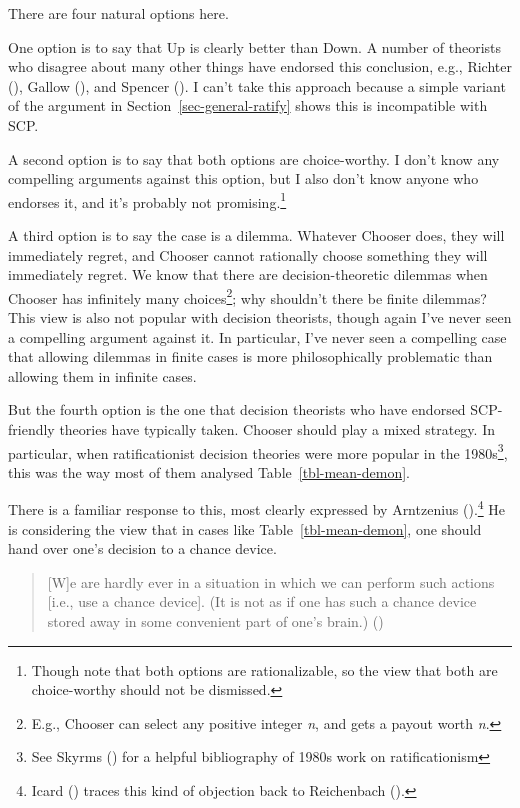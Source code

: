 \documentclass[
  10pt,
  letterpaper,
  DIV=11,
  numbers=noendperiod,
  twoside]{scrartcl}
\begin{document}
There are four natural options here.

One option is to say that Up is clearly better than Down. A number of
theorists who disagree about many other things have endorsed this
conclusion, e.g., Richter (), Gallow
(), and Spencer
(). I can't take this approach because
a simple variant of the argument in Section~\ref{sec-general-ratify}
shows this is incompatible with SCP.

A second option is to say that both options are choice-worthy. I don't
know any compelling arguments against this option, but I also don't know
anyone who endorses it, and it's probably not promising.\footnote{Though
  note that both options are rationalizable, so the view that both are
  choice-worthy should not be dismissed.}

A third option is to say the case is a dilemma. Whatever Chooser does,
they will immediately regret, and Chooser cannot rationally choose
something they will immediately regret. We know that there are
decision-theoretic dilemmas when Chooser has infinitely many
choices\footnote{E.g., Chooser can select any positive integer \emph{n},
  and gets a payout worth \emph{n}.}; why shouldn't there be finite
dilemmas? This view is also not popular with decision theorists, though
again I've never seen a compelling argument against it. In particular,
I've never seen a compelling case that allowing dilemmas in finite cases
is more philosophically problematic than allowing them in infinite
cases.

But the fourth option is the one that decision theorists who have
endorsed SCP-friendly theories have typically taken. Chooser should play
a mixed strategy. In particular, when ratificationist decision theories
were more popular in the 1980s\footnote{See Skyrms
  () for a helpful bibliography
  of 1980s work on ratificationism}, this was the way most of them
analysed Table~\ref{tbl-mean-demon}.

There is a familiar response to this, most clearly expressed by
Arntzenius ().\footnote{Icard
  () traces this kind of objection back to
  Reichenbach ().} He is considering
the view that in cases like Table~\ref{tbl-mean-demon}, one should hand
over one's decision to a chance device.

\begin{quote}
{[}W{]}e are hardly ever in a situation in which we can perform such
actions {[}i.e., use a chance device{]}. (It is not as if one has such a
chance device stored away in some convenient part of one's brain.)
()
\end{quote}
\end{document}
